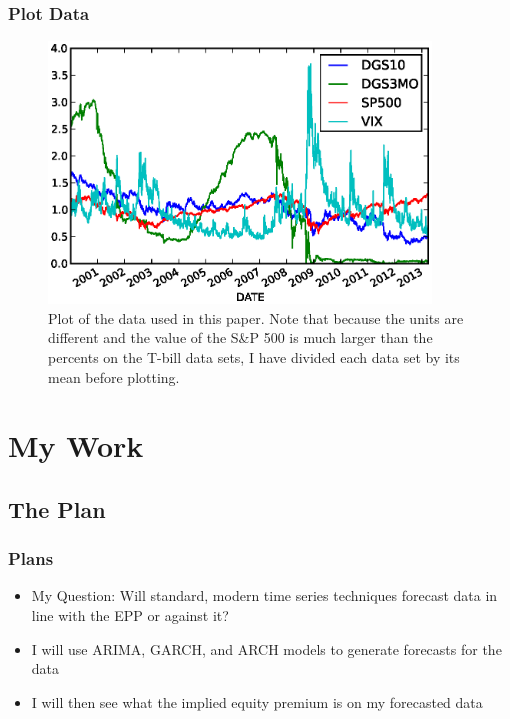 \documentclass[11pt]{beamer}
\theoremstyle{definition}
\begin{document}
  \begin{frame}[t]\frametitle{Plot Data}

    \begin{figure}[ht]
          \centering
          \includegraphics[width=4in]{.././Figures/all_data.eps}
          \caption{\small Plot of the data used in this paper. Note that because the units are different and the value of the S\&P 500 is much larger than the percents on the T-bill data sets, I have divided each data set by its mean before plotting.}
          \label{fig:alldata}
      \end{figure}

  \end{frame}

\section{My Work}

  \subsection{The Plan}
  \begin{frame} \frametitle{Plans}
    \begin{itemize}[<+->]
      \item My Question: Will standard, modern time series techniques forecast data in line with the EPP or against it?
      \item I will use ARIMA, GARCH, and ARCH models to generate forecasts for the data
      \item I will then see what the implied equity premium is on my forecasted data
    \end{itemize}
  \end{frame}
\end{document}
